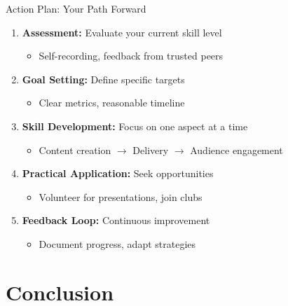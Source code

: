 \documentclass{beamer}
\begin{document}
\begin{frame}{Action Plan: Your Path Forward}
    \begin{enumerate}
        \item \textbf{Assessment:} Evaluate your current skill level
            \begin{itemize}
                \item Self-recording, feedback from trusted peers
            \end{itemize}
        \item \textbf{Goal Setting:} Define specific targets
            \begin{itemize}
                \item Clear metrics, reasonable timeline
            \end{itemize}
        \item \textbf{Skill Development:} Focus on one aspect at a time
            \begin{itemize}
                \item Content creation $\rightarrow$ Delivery $\rightarrow$ Audience engagement
            \end{itemize}
        \item \textbf{Practical Application:} Seek opportunities
            \begin{itemize}
                \item Volunteer for presentations, join clubs
            \end{itemize}
        \item \textbf{Feedback Loop:} Continuous improvement
            \begin{itemize}
                \item Document progress, adapt strategies
            \end{itemize}
    \end{enumerate}
\end{frame}

\section{Conclusion}
\end{document}
